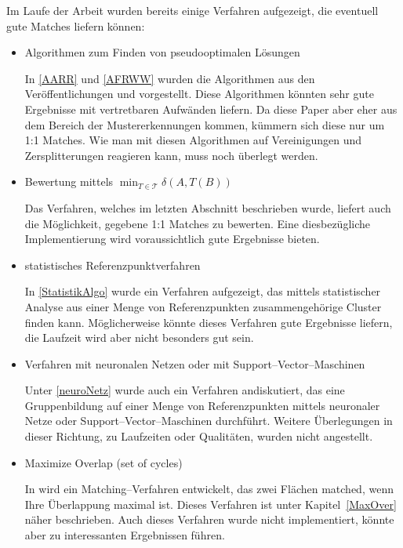 Im Laufe der Arbeit wurden bereits einige Verfahren aufgezeigt, die eventuell gute Matches liefern können:
\begin{itemize}
\item Algorithmen zum Finden von pseudooptimalen Lösungen

In \vref{AARR} und \vref{AFRWW} wurden die Algorithmen aus den Veröffentlichungen \cite{AAR} und \cite{AFRW} vorgestellt. Diese Algorithmen könnten sehr gute Ergebnisse mit vertretbaren Aufwänden liefern. Da diese Paper aber eher aus dem Bereich der Mustererkennungen kommen, kümmern sich diese nur um 1:1 Matches.  Wie man mit diesen Algorithmen auf Vereinigungen und Zersplitterungen reagieren kann, muss noch überlegt werden.

\item Bewertung mittels $\min_{T\in\mathcal{T}}\delta(A,T(B))$

Das Verfahren, welches im letzten Abschnitt beschrieben wurde, liefert auch die Möglichkeit, gegebene 1:1 Matches zu bewerten. Eine diesbezügliche Implementierung wird voraussichtlich gute Ergebnisse bieten. 

\item statistisches Referenzpunktverfahren

In \vref{StatistikAlgo} wurde ein Verfahren aufgezeigt, das mittels statistischer Analyse aus einer Menge von Referenzpunkten zusammengehörige Cluster finden kann. Möglicherweise könnte dieses Verfahren gute Ergebnisse liefern, die Laufzeit wird aber nicht besonders gut sein.

\item Verfahren mit neuronalen Netzen oder mit Support--Vector--Maschinen

Unter \vref{neuroNetz} wurde auch ein Verfahren andiskutiert, das eine Gruppenbildung auf einer Menge von Referenzpunkten mittels neuronaler Netze oder Support--Vector--Maschinen durchführt. Weitere Überlegungen in dieser Richtung, zu Laufzeiten oder Qualitäten, wurden nicht angestellt. 
 
\item Maximize Overlap (set of cycles)

In \cite{TG} wird ein Matching--Verfahren entwickelt, das zwei Flächen matched, wenn Ihre Überlappung maximal ist. Dieses Verfahren ist unter Kapitel~\vref{MaxOver} näher beschrieben. Auch dieses Verfahren wurde nicht implementiert, könnte aber zu interessanten Ergebnissen führen.
\end{itemize}



